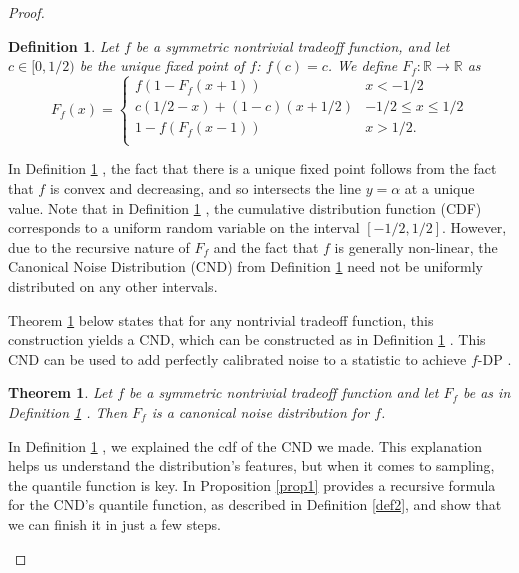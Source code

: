 \documentclass{article}
\newtheorem{thm}{Theorem}
\newtheorem{defn}{Definition}
\begin{document}
\begin{proof}
\begin{enumerate}
\begin{defn} \label{def1}  %
Let $f$ be a symmetric nontrivial tradeoff function, and let {$c\in [0,1/2)$} be the unique fixed point of $f$: $f(c)=c$. 
We define $F_f:\mathbb{R}\rightarrow \mathbb{R}$ as  \[ F_f(x) = \begin{cases}
    f(1-F_f(x+1))&x<-1/2\\
    c(1/2-x) + (1-c)(x+1/2)&-1/2\leq x\leq 1/2\\
    1-f(F_f(x-1))&x>1/2.\\
\end{cases}\]
\end{defn}
In Definition \ref{def1} \parencite{awan2023canonical}, 
the fact that there is a unique fixed point follows from the fact that $f$ is convex and decreasing, 
and so intersects the line $y=\alpha$ at a unique value. 
Note that in Definition \ref{def1} \parencite{awan2023canonical}, 
the cumulative distribution function (CDF) corresponds to a uniform random variable on the interval $[-1/2,1/2]$. 
However, due to the recursive nature of $F_f$ and the fact that $f$ is generally non-linear, 
the Canonical Noise Distribution (CND) from Definition \ref{def1} \parencite{awan2023canonical} need not be uniformly distributed on any other intervals.

Theorem \ref{thm1} \parencite{awan2023canonical} below states that for any nontrivial tradeoff function, 
this construction yields a CND, which can be constructed as in Definition \ref{def1} \parencite{awan2023canonical}. 
This CND can be used to add perfectly calibrated noise to a statistic to achieve $f$-DP \parencite{dong2019gaussian}. 

\begin{thm} \label{thm1}  %
Let $f$ be a symmetric nontrivial tradeoff function and let $F_f$ be as in Definition \ref{def1} \parencite{awan2023canonical}. 
Then $F_f$ is a canonical noise distribution for $f$. 
\end{thm}

In Definition \ref{def1} \parencite{awan2023canonical}, we explained the cdf of the CND we made. 
This explanation helps us understand the distribution's features, but when it comes to sampling, the quantile function is key. 
In Proposition \ref{prop1} \parencite{awan2023canonical} provides a recursive formula for the CND's quantile function,
as described in Definition \ref{def2}\parencite{awan2023canonical}, and show that we can finish it in just a few steps.


\end{enumerate}
\end{proof}
\end{document}
